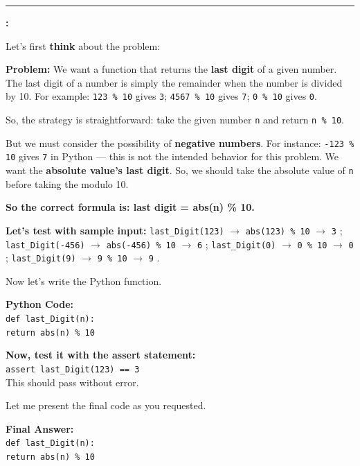 \begin{ReasoningBox}[title={Case Study: Code Generation (Pre-RL/Post-RL Setting)}, breakable]
\medskip
\noindent\rule{\linewidth}{0.4pt}
\medskip

\textbf{\ours:}

Let's first \textbf{think} about the problem:

\textbf{Problem:} We want a function that returns the \textbf{last digit} of a given number. The last digit of a number is simply the remainder when the number is divided by 10. For example: \texttt{123 \% 10} gives \texttt{3}; \texttt{4567 \% 10} gives \texttt{7}; \texttt{0 \% 10} gives \texttt{0}.

So, the strategy is straightforward: take the given number \texttt{n} and return \texttt{n \% 10}.

But we must consider the possibility of \textbf{negative numbers}. For instance: \texttt{-123 \% 10} gives \texttt{7} in Python --- this is not the intended behavior for this problem. We want the \textbf{absolute value's last digit}. So, we should take the absolute value of \texttt{n} before taking the modulo 10.

\textbf{So the correct formula is: last digit = abs(n) \% 10.}

\textbf{Let's test with sample input:}
\texttt{last\_Digit(123)} $\to$ \texttt{abs(123) \% 10} $\to$ \texttt{3} ;\;
\texttt{last\_Digit(-456)} $\to$ \texttt{abs(-456) \% 10} $\to$ \texttt{6} ;\;
\texttt{last\_Digit(0)} $\to$ \texttt{0 \% 10} $\to$ \texttt{0} ;\;
\texttt{last\_Digit(9)} $\to$ \texttt{9 \% 10} $\to$ \texttt{9} .

Now let's write the Python function.

\textbf{Python Code:}\\
\hspace*{1em}\texttt{def last\_Digit(n):}\\
\hspace*{2.5em}\texttt{return abs(n) \% 10}

\textbf{Now, test it with the assert statement:}\\
\hspace*{1em}\texttt{assert last\_Digit(123) == 3}\\
This should pass without error.

Let me present the final code as you requested.

\textbf{ Final Answer:}\\
\hspace*{1em}\texttt{def last\_Digit(n):}\\
\hspace*{2.5em}\texttt{return abs(n) \% 10}
\end{ReasoningBox}
\label{fig:example_code}

